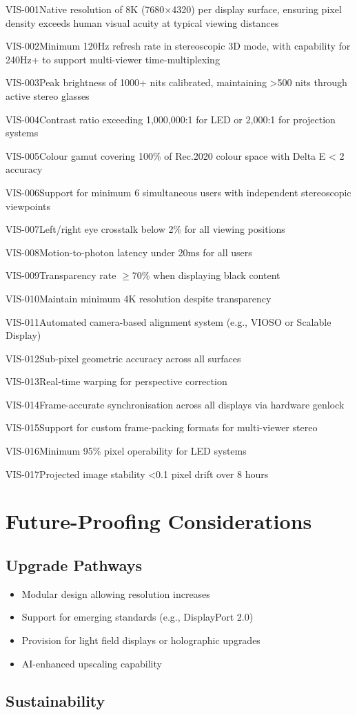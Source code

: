 \begin{requirement}{VIS-001}{Native resolution of 8K (7680×4320) per display surface, ensuring pixel density exceeds human visual acuity at typical viewing distances}
\begin{requirement}{VIS-002}{Minimum 120Hz refresh rate in stereoscopic 3D mode, with capability for 240Hz+ to support multi-viewer time-multiplexing}
\begin{requirement}{VIS-003}{Peak brightness of 1000+ nits calibrated, maintaining >500 nits through active stereo glasses}
\begin{requirement}{VIS-004}{Contrast ratio exceeding 1,000,000:1 for LED or 2,000:1 for projection systems}
\begin{requirement}{VIS-005}{Colour gamut covering 100\% of Rec.2020 colour space with Delta E < 2 accuracy}
\begin{requirement}{VIS-006}{Support for minimum 6 simultaneous users with independent stereoscopic viewpoints}
\begin{requirement}{VIS-007}{Left/right eye crosstalk below 2\% for all viewing positions}
\begin{requirement}{VIS-008}{Motion-to-photon latency under 20ms for all users}
\begin{requirement}{VIS-009}{Transparency rate $\ge$70\% when displaying black content}
\begin{requirement}{VIS-010}{Maintain minimum 4K resolution despite transparency}
\begin{requirement}{VIS-011}{Automated camera-based alignment system (e.g., VIOSO or Scalable Display)}
\begin{requirement}{VIS-012}{Sub-pixel geometric accuracy across all surfaces}
\begin{requirement}{VIS-013}{Real-time warping for perspective correction}
\begin{requirement}{VIS-014}{Frame-accurate synchronisation across all displays via hardware genlock}
\begin{requirement}{VIS-015}{Support for custom frame-packing formats for multi-viewer stereo}
\begin{requirement}{VIS-016}{Minimum 95\% pixel operability for LED systems}
\begin{requirement}{VIS-017}{Projected image stability <0.1 pixel drift over 8 hours}
\section{Future-Proofing Considerations}

\subsection{Upgrade Pathways}

\begin{itemize}
    \item Modular design allowing resolution increases
    \item Support for emerging standards (e.g., DisplayPort 2.0)
    \item Provision for light field displays or holographic upgrades
    \item AI-enhanced upscaling capability
\end{itemize}

\subsection{Sustainability}


\end{requirement}
\end{requirement}
\end{requirement}
\end{requirement}
\end{requirement}
\end{requirement}
\end{requirement}
\end{requirement}
\end{requirement}
\end{requirement}
\end{requirement}
\end{requirement}
\end{requirement}
\end{requirement}
\end{requirement}
\end{requirement}
\end{requirement}
